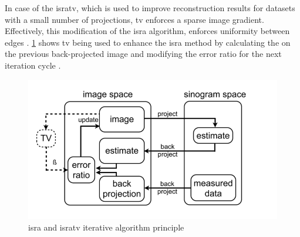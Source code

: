 In case of the \gls{isratv}, which is used to improve reconstruction results for datasets with a small number of projections,
\acrfull{tv} enforces a sparse image gradient.
Effectively, this modification of the \gls{isra} algorithm, enforces uniformity between edges \cite{vandeghinsteLowDoseMicroCTImaging2013}.
\cref{fig:isra} shows \acrshort{tv} being used to enhance the \gls{isra} method by
calculating the  on the previous back-projected image and modifying the error ratio for the next iteration cycle \cite{vandeghinsteLowDoseMicroCTImaging2013}.
\begin{figure}[h]
	\centerline{
		\includegraphics[scale=0.5]{images/isra.png}}
	\caption{\gls{isra} and \gls{isratv} iterative algorithm principle \cite{vandeghinsteLowDoseMicroCTImaging2013}}\label{fig:isra}
\end{figure}

